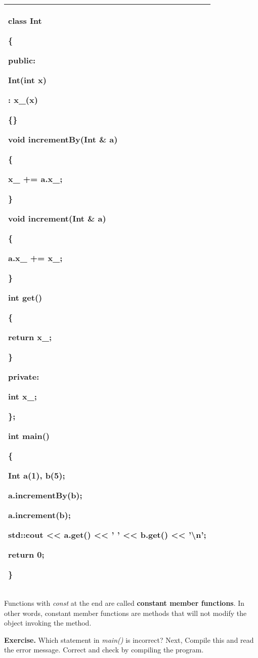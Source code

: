 \documentclass[
]{article}
\begin{document}
\begin{longtable}[]{@{}l@{}}
\toprule
\endhead
\begin{minipage}[t]{0.97\columnwidth}\raggedright
class Int

\{

public:

Int(int x)

: x\_(x)

\{\}

void incrementBy(Int \& a)

\{

x\_ += a.x\_;

\}

void increment(Int \& a)

\{

a.x\_ += x\_;

\}

int get()

\{

return x\_;

\}

private:

int x\_;

\};

int main()

\{

Int a(1), b(5);

a.incrementBy(b);

a.increment(b);

std::cout \textless\textless{} a.get() \textless\textless{} ' '
\textless\textless{} b.get() \textless\textless{} '\textbackslash n';

return 0;

\}\strut
\end{minipage}\tabularnewline
\bottomrule
\end{longtable}

Functions with \emph{const} at the end are called \textbf{constant
member functions}.\textbf{ }In other words, constant member functions
are methods that will not modify the object invoking the method.

\textbf{Exercise.} Which statement in \emph{main()} is incorrect? Next,
Compile this and read the error message. Correct and check by compiling
the program.
\end{document}

